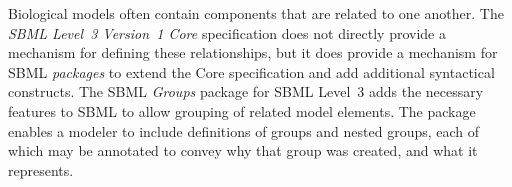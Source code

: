 Biological models often contain components that are related to one another.  The \emph{SBML Level~3 Version~1 Core} specification does not directly provide a mechanism for defining these relationships, but it does provide a mechanism for SBML \emph{packages} to extend the Core specification and add additional syntactical constructs.  The SBML \emph{Groups} package for SBML Level~3 adds the necessary features to SBML to allow grouping of related model elements.  The package enables a modeler to include definitions of groups and nested groups, each of which may be annotated to convey why that group was created, and what it represents.
